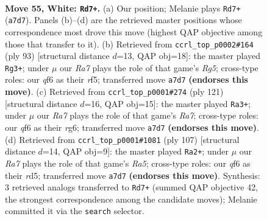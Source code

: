 \documentclass[11pt]{article}
\begin{document}
\clearpage

\begin{figure}[p]\centering
\begin{subfigure}{0.46\textwidth}\centering
\resizebox{\linewidth}{!}{%
\newchessgame
\chessboard[
  setfen={8/R7/5q2/8/1p1k4/b4BK1/8/8 w - - 0 55},
  showmover=false,
  pgfstyle=straightmove, color=movearrow, markmove={a7-d7}
]}
\caption{}
\end{subfigure}\hfill
\begin{subfigure}{0.46\textwidth}\centering
\resizebox{\linewidth}{!}{%
\newchessgame
\chessboard[
  setfen={8/8/3k4/5R2/2B3r1/1P2K3/1b6/8 b - - 10 47},
  showmover=false,
  pgfstyle=straightmove, color=movearrow, markmove={g4-g3}
]}
\caption{}
\end{subfigure}
\\[4pt]
\begin{subfigure}{0.46\textwidth}\centering
\resizebox{\linewidth}{!}{%
\newchessgame
\chessboard[
  setfen={8/8/6R1/1P6/8/3K3k/r3Bb2/8 b - - 30 61},
  showmover=false,
  pgfstyle=straightmove, color=movearrow, markmove={a2-a3}
]}
\caption{}
\end{subfigure}\hfill
\begin{subfigure}{0.46\textwidth}\centering
\resizebox{\linewidth}{!}{%
\newchessgame
\chessboard[
  setfen={8/8/5k2/3Rb3/r5B1/7P/5K2/8 b - - 18 54},
  showmover=false,
  pgfstyle=straightmove, color=movearrow, markmove={a4-a2}
]}
\caption{}
\end{subfigure}
\caption{\textbf{Move 55, White: \texttt{Rd7+}.} (a) Our position; Melanie plays \texttt{Rd7+} (\texttt{a7d7}). Panels (b)--(d) are the retrieved master positions whose correspondence most drove this move (highest QAP objective among those that transfer to it). (b) Retrieved from \texttt{ccrl\_top\_p0002\#164} (ply 93) [structural distance $d$=13, QAP obj=18]: the master played \texttt{Rg3+}; under $\mu$ our \emph{Ra7} plays the role of that game's \emph{Rg5}; cross-type roles: our \emph{q}f6 as their \emph{r}f5; transferred move \texttt{a7d7} \textbf{(endorses this move)}. (c) Retrieved from \texttt{ccrl\_top\_p0001\#274} (ply 121) [structural distance $d$=16, QAP obj=15]: the master played \texttt{Ra3+}; under $\mu$ our \emph{Ra7} plays the role of that game's \emph{Ra7}; cross-type roles: our \emph{q}f6 as their \emph{r}g6; transferred move \texttt{a7d7} \textbf{(endorses this move)}. (d) Retrieved from \texttt{ccrl\_top\_p0001\#1081} (ply 107) [structural distance $d$=14, QAP obj=9]: the master played \texttt{Ra2+}; under $\mu$ our \emph{Ra7} plays the role of that game's \emph{Ra5}; cross-type roles: our \emph{q}f6 as their \emph{r}d5; transferred move \texttt{a7d7} \textbf{(endorses this move)}. Synthesis: 3 retrieved analogs transferred to \texttt{Rd7+} (summed QAP objective 42, the strongest correspondence among the candidate moves); Melanie committed it via the \texttt{search} selector.}
\label{fig:thought-m108}
\end{figure}
\end{document}

